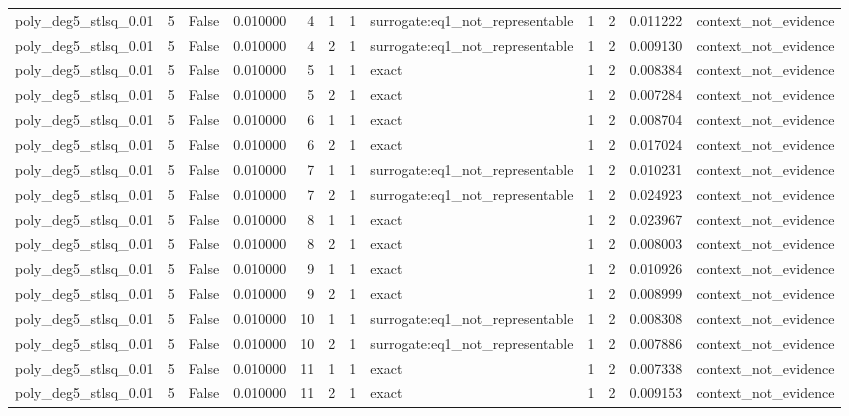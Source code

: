 \begin{tabular}{lrrrrrrlrrrl}
poly\_deg5\_stlsq\_0.01 & 5 & False & 0.010000 & 4 & 1 & 1 & surrogate:eq1\_not\_representable & 1 & 2 & 0.011222 & context\_not\_evidence \\
poly\_deg5\_stlsq\_0.01 & 5 & False & 0.010000 & 4 & 2 & 1 & surrogate:eq1\_not\_representable & 1 & 2 & 0.009130 & context\_not\_evidence \\
poly\_deg5\_stlsq\_0.01 & 5 & False & 0.010000 & 5 & 1 & 1 & exact & 1 & 2 & 0.008384 & context\_not\_evidence \\
poly\_deg5\_stlsq\_0.01 & 5 & False & 0.010000 & 5 & 2 & 1 & exact & 1 & 2 & 0.007284 & context\_not\_evidence \\
poly\_deg5\_stlsq\_0.01 & 5 & False & 0.010000 & 6 & 1 & 1 & exact & 1 & 2 & 0.008704 & context\_not\_evidence \\
poly\_deg5\_stlsq\_0.01 & 5 & False & 0.010000 & 6 & 2 & 1 & exact & 1 & 2 & 0.017024 & context\_not\_evidence \\
poly\_deg5\_stlsq\_0.01 & 5 & False & 0.010000 & 7 & 1 & 1 & surrogate:eq1\_not\_representable & 1 & 2 & 0.010231 & context\_not\_evidence \\
poly\_deg5\_stlsq\_0.01 & 5 & False & 0.010000 & 7 & 2 & 1 & surrogate:eq1\_not\_representable & 1 & 2 & 0.024923 & context\_not\_evidence \\
poly\_deg5\_stlsq\_0.01 & 5 & False & 0.010000 & 8 & 1 & 1 & exact & 1 & 2 & 0.023967 & context\_not\_evidence \\
poly\_deg5\_stlsq\_0.01 & 5 & False & 0.010000 & 8 & 2 & 1 & exact & 1 & 2 & 0.008003 & context\_not\_evidence \\
poly\_deg5\_stlsq\_0.01 & 5 & False & 0.010000 & 9 & 1 & 1 & exact & 1 & 2 & 0.010926 & context\_not\_evidence \\
poly\_deg5\_stlsq\_0.01 & 5 & False & 0.010000 & 9 & 2 & 1 & exact & 1 & 2 & 0.008999 & context\_not\_evidence \\
poly\_deg5\_stlsq\_0.01 & 5 & False & 0.010000 & 10 & 1 & 1 & surrogate:eq1\_not\_representable & 1 & 2 & 0.008308 & context\_not\_evidence \\
poly\_deg5\_stlsq\_0.01 & 5 & False & 0.010000 & 10 & 2 & 1 & surrogate:eq1\_not\_representable & 1 & 2 & 0.007886 & context\_not\_evidence \\
poly\_deg5\_stlsq\_0.01 & 5 & False & 0.010000 & 11 & 1 & 1 & exact & 1 & 2 & 0.007338 & context\_not\_evidence \\
poly\_deg5\_stlsq\_0.01 & 5 & False & 0.010000 & 11 & 2 & 1 & exact & 1 & 2 & 0.009153 & context\_not\_evidence \\

\end{tabular}
